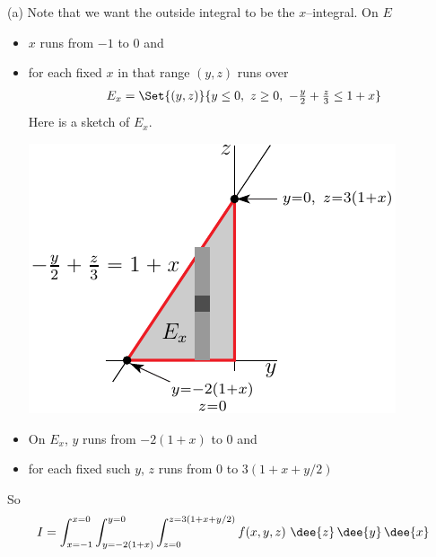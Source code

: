 \begin{solution}
(a) Note that we want the outside integral to be the $x$--integral.
On $E$
\begin{itemize}
\item 
$x$ runs from $-1$ to $0$ and
\item
for each fixed $x$ in that range $(y,z)$ runs over
\begin{align*}
E_x=\Set{(y,z)}{y\le 0,\ z\ge 0,\ -\tfrac{y}{2}+\tfrac{z}{3}\le 1+x}
\end{align*}
Here is a sketch of $E_x$.
\begin{center}
     \includegraphics{fig/OE09A_8a.pdf}
\end{center}

\item
On $E_x$, $y$ runs from $-2(1+x)$ to $0$ and
\item
for each fixed such $y$, $z$ runs from $0$ to $3(1+x+y/2)$
\end{itemize}
So
\begin{align*}
I = \int_{x=-1}^{x=0}\int_{y=-2(1+x)}^{y=0}\int_{z=0}^{z=3(1+x+y/2)} f(x,y,z)\ 
                                      \dee{z}\,\dee{y}\,\dee{x}
\end{align*}


\end{solution}
